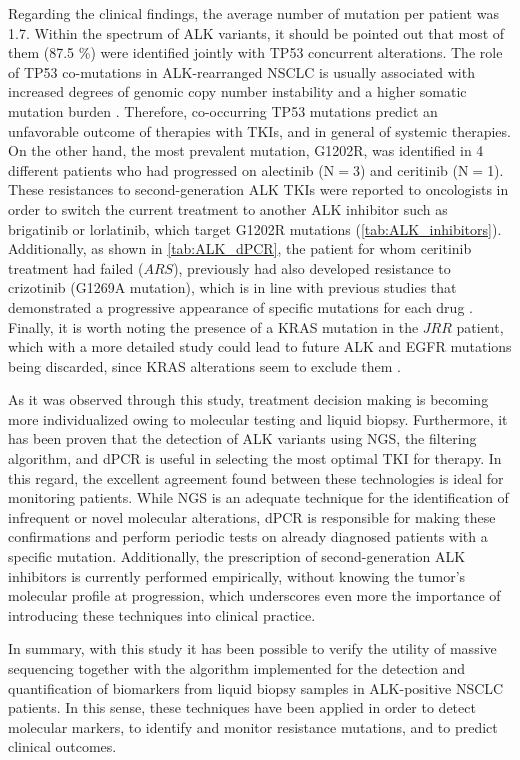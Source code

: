 Regarding the clinical findings, the average number of mutation per patient was 1.7. Within the spectrum of ALK variants, it should be pointed out that most of them (87.5 \%) were identified jointly with TP53 concurrent alterations. The role of TP53 co-mutations in ALK-rearranged NSCLC is usually associated with increased degrees of genomic copy number instability and a higher somatic mutation burden \cite{NSCLC_alterations}. Therefore, co-occurring TP53 mutations predict an unfavorable outcome of therapies with TKIs, and in general of systemic therapies. On the other hand, the most prevalent mutation, G1202R, was identified in 4 different patients who had progressed on alectinib (N$=$3) and ceritinib (N$=$1). These resistances to second-generation ALK TKIs were reported to oncologists in order to switch the current treatment to another ALK inhibitor such as brigatinib or lorlatinib, which target G1202R mutations (\autoref{tab:ALK_inhibitors}). Additionally, as shown in \autoref{tab:ALK_dPCR}, the patient for whom ceritinib treatment had failed ($ARS$), previously had also developed resistance to crizotinib (G1269A mutation), which is in line with previous studies that demonstrated a progressive appearance of specific mutations for each drug \cite{ALK_resistance, ALK_inhibitors}. Finally, it is worth noting the presence of a KRAS mutation in the $JRR$ patient, which with a more detailed study could lead to future ALK and EGFR mutations being discarded, since KRAS alterations seem to exclude them \cite{Mol_bio, NSCLC_therapies}.

As it was observed through this study, treatment decision making is becoming more individualized owing to molecular testing and liquid biopsy. Furthermore, it has been proven that the detection of ALK variants using NGS, the filtering algorithm, and dPCR is useful in selecting the most optimal TKI for therapy. In this regard, the excellent agreement found between these technologies is ideal for monitoring patients. While NGS is an adequate technique for the identification of infrequent or novel molecular alterations, dPCR is responsible for making these confirmations and perform periodic tests on already diagnosed patients with a specific mutation. Additionally, the prescription of second-generation ALK inhibitors is currently performed empirically, without knowing the tumor's molecular profile at progression, which underscores even more the importance of introducing these techniques into clinical practice.

In summary, with this study it has been possible to verify the utility of massive sequencing together with the algorithm implemented for the detection and quantification of biomarkers from liquid biopsy samples in ALK-positive NSCLC patients. In this sense, these techniques have been applied in order to detect molecular markers, to identify and monitor resistance mutations, and to predict clinical outcomes.


